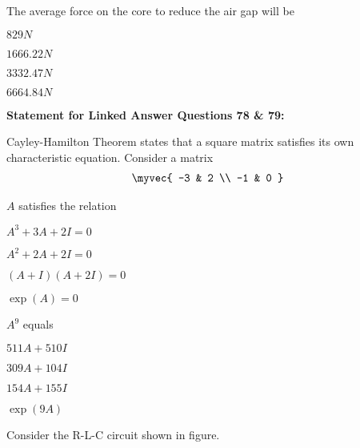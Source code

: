     \item [77.] The average force on the core to reduce the air gap will be
    \begin{enumerate}
    \begin{multicols}{4}
        \item $829 N$
        \item $1666.22 N$
        \item $3332.47 N$
        \item $6664.84 N$
        \end{multicols}
    \end{enumerate}


\textbf{Statement for Linked Answer Questions 78 \& 79:}

Cayley-Hamilton Theorem states that a square matrix satisfies its own characteristic equation. Consider a matrix
\begin{align}
\myvec{ -3 & 2 \\
         -1 & 0 } 
\end{align}


    \item [78.] $A$ satisfies the relation
    \begin{enumerate}
    \begin{multicols}{4}
        \item $A^3 + 3A + 2I = 0$
        \item $A^2 + 2A + 2I = 0$
        \item $(A + I)(A + 2I) = 0$
        \item $\exp(A) = 0$
        \end{multicols}
    \end{enumerate}

    \item [79.] $A^9$ equals
    \begin{enumerate}
    \begin{multicols}{4}
        \item $511 A + 510 I$
        \item $309 A + 104 I$
        \item $154 A + 155 I$
        \item $\exp(9A)$
        \end{multicols}
    \end{enumerate}




Consider the R-L-C circuit shown in figure.

